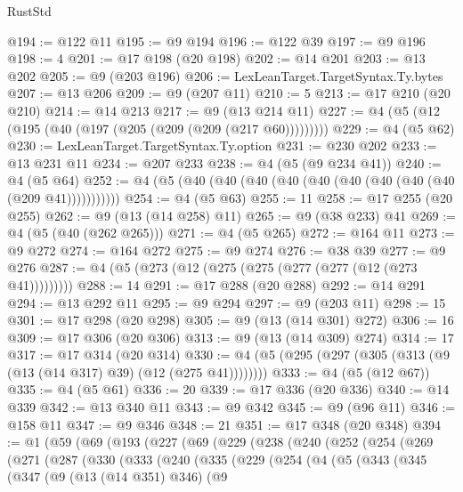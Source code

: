 \begin{lexlean}{RustStd}
\begin{coremodule}
{\begin{coremodule}
{{{{{{{{{{{{{{{{{{{{{{{{{{{{{{{{@194 := @122 @11
@195 := @9 @194
@196 := @122 @39
@197 := @9 @196
@198 := 4
@201 := @17 @198 (@20 @198)
@202 := @14 @201
@203 := @13 @202
@205 := @9 (@203 @196)
@206 := LexLeanTarget.TargetSyntax.Ty.bytes
@207 := @13 @206
@209 := @9 (@207 @11)
@210 := 5
@213 := @17 @210 (@20 @210)
@214 := @14 @213
@217 := @9 (@13 @214 @11)
@227 := @4 (@5 (@12 (@195 (@40 (@197 (@205 (@209 (@209 (@217 @60)))))))))
@229 := @4 (@5 @62)
@230 := LexLeanTarget.TargetSyntax.Ty.option
@231 := @230 @202
@233 := @13 @231 @11
@234 := @207 @233
@238 := @4 (@5 (@9 @234 @41))
@240 := @4 (@5 @64)
@252 := @4 (@5 (@40 (@40 (@40 (@40 (@40 (@40 (@40 (@40 (@40 (@209 @41)))))))))))
@254 := @4 (@5 @63)
@255 := 11
@258 := @17 @255 (@20 @255)
@262 := @9 (@13 (@14 @258) @11)
@265 := @9 (@38 @233) @41
@269 := @4 (@5 (@40 (@262 @265)))
@271 := @4 (@5 @265)
@272 := @164 @11
@273 := @9 @272
@274 := @164 @272
@275 := @9 @274
@276 := @38 @39
@277 := @9 @276
@287 := @4 (@5 (@273 (@12 (@275 (@275 (@277 (@277 (@12 (@273 @41)))))))))
@288 := 14
@291 := @17 @288 (@20 @288)
@292 := @14 @291
@294 := @13 @292 @11
@295 := @9 @294
@297 := @9 (@203 @11)
@298 := 15
@301 := @17 @298 (@20 @298)
@305 := @9 (@13 (@14 @301) @272)
@306 := 16
@309 := @17 @306 (@20 @306)
@313 := @9 (@13 (@14 @309) @274)
@314 := 17
@317 := @17 @314 (@20 @314)
@330 := @4 (@5 (@295 (@297 (@305 (@313 (@9 (@13 (@14 @317) @39) (@12 (@275 @41))))))))
@333 := @4 (@5 (@12 @67))
@335 := @4 (@5 @61)
@336 := 20
@339 := @17 @336 (@20 @336)
@340 := @14 @339
@342 := @13 @340 @11
@343 := @9 @342
@345 := @9 (@96 @11)
@346 := @158 @11
@347 := @9 @346
@348 := 21
@351 := @17 @348 (@20 @348)
@394 := @1
    (@59
      (@69
        (@193
          (@227
            (@69
              (@229
                (@238
                  (@240
                    (@252
                      (@254
                        (@269
                          (@271
                            (@287
                              (@330
                                (@333
                                  (@240
                                    (@335
                                      (@229
                                        (@254
                                          (@4
                                            (@5
                                              (@343
                                                (@345
                                                  (@347
                                                    (@9
                                                      (@13 (@14 @351) @346)
                                                      (@9
}}}}}}}}}}}}}}}}}}}}}}}}}}}}}}}}
\end{coremodule}}
\end{coremodule}
\end{lexlean}
